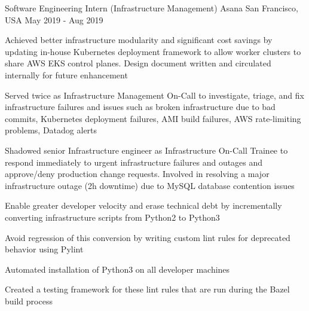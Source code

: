 

\begin{cventries}


  \cventry
  {Software Engineering Intern (Infrastructure Management)} %
    {Asana} %
    {San Francisco, USA} %
    {May 2019 - Aug 2019} %
    {
      \begin{cvitems} %
      \item {Achieved better infrastructure modularity and significant cost savings by updating in-house Kubernetes deployment framework to allow worker clusters to share AWS EKS control planes. Design document written and circulated internally for future enhancement}
      \item {Served twice as Infrastructure Management On-Call to investigate, triage, and fix infrastructure failures and issues such as broken infrastructure due to bad commits, Kubernetes deployment failures, AMI build failures, AWS rate-limiting problems, Datadog alerts}
      \item {Shadowed senior Infrastructure engineer as Infrastructure On-Call Trainee to respond immediately to urgent infrastructure failures and outages and approve/deny production change requests. Involved in resolving a major infrastructure outage (2h downtime) due to MySQL database contention issues}
      \item {Enable greater developer velocity and erase technical debt by incrementally converting infrastructure scripts from Python2 to Python3}
      \item {Avoid regression of this conversion by writing custom lint rules for deprecated behavior using Pylint}
      \item {Automated installation of Python3 on all developer machines}
      \item {Created a testing framework for these lint rules that are run during the Bazel build process}
      \end{cvitems}
    }


\end{cventries}
